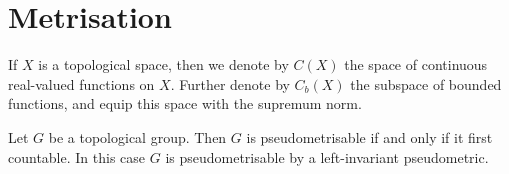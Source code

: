\documentclass[article, a4paper, 11pt, oneside]{memoir}
\numberwithin{equation}{chapter}
\begin{document}


\section{Metrisation}

\newcommand{\field}{\mathbb{K}}

\newcommand{\GL}[1]{\mathrm{GL}(#1)}

If $X$ is a topological space, then we denote by $C(X)$ the space of continuous real-valued functions on $X$. Further denote by $C_b(X)$ the subspace of bounded functions, and equip this space with the supremum norm.

\begin{theorem}
    Let $G$ be a topological group. Then $G$ is pseudometrisable if and only if it first countable. In this case $G$ is pseudometrisable by a left-invariant pseudometric.
\end{theorem}
\end{document}
